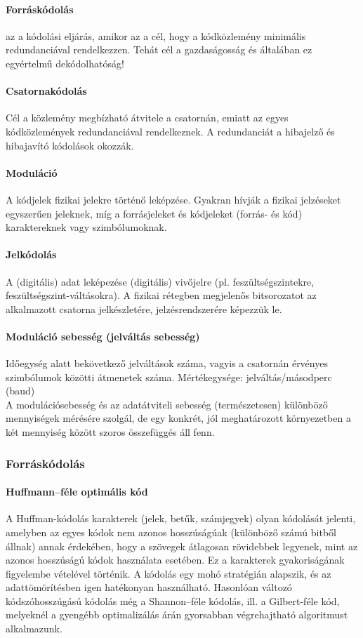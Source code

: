 \paragraph{Forráskódolás} az a kódolási eljárás, amikor az a cél, hogy a kódközlemény minimális redundanciával rendelkezzen. Tehát cél a gazdaságosság és általában ez egyértelmű dekódolhatóság!

\paragraph{Csatornakódolás} Cél a közlemény megbízható átvitele a csatornán, emiatt az egyes kódközlemények redundanciával rendelkeznek. A redundanciát a hibajelző és hibajavító kódolások okozzák.

\paragraph{Moduláció} A kódjelek fizikai jelekre történő leképzése. Gyakran hívják a fizikai jelzéseket egyszerűen jeleknek, míg a forrásjeleket és kódjeleket (forrás- és kód) karaktereknek vagy szimbólumoknak.


\paragraph{Jelkódolás} A (digitális) adat leképezése (digitális) vivőjelre (pl. feszültségszintekre, feszültségszint-váltásokra). A fizikai rétegben megjelenős bitsorozatot az alkalmazott csatorna jelkészletére, jelzésrendszerére képezzük le.

\paragraph{Moduláció sebesség (jelváltás sebesség)} Időegység alatt bekövetkező jelváltások száma, vagyis a csatornán érvényes szimbólumok közötti átmenetek száma. Mértékegysége: jelváltás/másodperc (baud)\\
A modulációsebesség és az adatátviteli sebesség (természetesen) különböző mennyiségek mérésére szolgál, de egy konkrét, jól meghatározott környezetben a két mennyiség között szoros összefüggés áll fenn.

\subsubsection{Forráskódolás}
\paragraph{Huffmann--féle optimális kód}
A Huffman-kódolás karakterek (jelek, betűk, számjegyek) olyan kódolását jelenti, amelyben az egyes kódok nem azonos hosszúságúak (különböző számú bitből állnak) annak érdekében, hogy a szövegek átlagosan rövidebbek legyenek, mint az azonos hosszúságú kódok használata esetében. Ez a karakterek gyakoriságának figyelembe vételével történik. A kódolás egy mohó stratégián alapszik, és az adattömörítésben igen hatékonyan használható. Hasonlóan változó kódszóhosszúgású kódolás még a Shannon--féle kódolás, ill. a Gilbert-féle kód, melyeknél a gyengébb optimalizálás árán gyorsabban végrehajtható algoritmust alkalmazunk.

